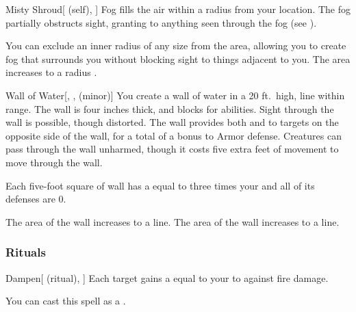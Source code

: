 \lowercase{\hypertarget{spell:Misty Shroud}{}}\label{spell:Misty Shroud}
\begin{attuneability}[Rank 4]{\hypertarget{spell:Misty Shroud}{Misty Shroud}}[ (self), ]
\targetrule
Fog fills the air within a \areamed radius  from your location.
The fog partially obstructs sight, granting  to anything seen through the fog (see ).

 You can exclude an inner radius of any size from the area, allowing you to create fog that surrounds you without blocking sight to things adjacent to you.
 The area increases to a \arealarge radius .
\end{attuneability}
\vspace{0.25em}



\lowercase{\hypertarget{spell:Wall of Water}{}}\label{spell:Wall of Water}
\begin{freeability}[Rank 4]{\hypertarget{spell:Wall of Water}{Wall of Water}}[, ,  (minor)]
\targetrule
You create a wall of water in a 20 ft.\ high, \arealarge line within \rngmed range.
The wall is four inches thick, and blocks  for abilities.
Sight through the wall is possible, though distorted.
The wall provides both  and  to targets on the opposite side of the wall, for a total of a  bonus to Armor defense.
Creatures can pass through the wall unharmed, though it costs five extra feet of movement to move through the wall.

Each five-foot square of wall has a  equal to three times your  and all of its defenses are 0.

\rankline
{} The area of the wall increases to a \areahuge line.
 The area of the wall increases to a \areaext line.
\end{freeability}
\vspace{0.25em}



\subsubsection{Rituals}


\lowercase{\hypertarget{spell:Dampen}{}}\label{spell:Dampen}
\begin{attuneability}[Rank 1]{\hypertarget{spell:Dampen}{Dampen}}[ (ritual), ]
Each target gains a  equal to your  to  against fire damage.

You can cast this spell as a .
\end{attuneability}
\vspace{0.25em}



